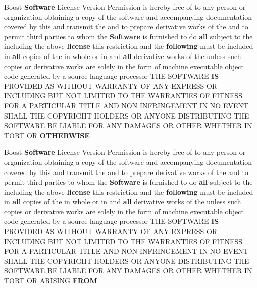 \begin{DoxyCompactItemize}
Boost {\bf Software} License Version Permission is hereby free of to any person or organization obtaining a copy of the software and accompanying documentation covered by this and transmit the and to prepare derivative works of the and to permit third parties to whom the {\bf Software} is furnished to do {\bf all} subject to the including the above {\bf license} this restriction and the {\bf following} must be included in {\bf all} copies of the in whole or in and {\bf all} derivative works of the unless such copies or derivative works are solely in the form of machine executable object code generated by a source language processor T\+HE S\+O\+F\+T\+W\+A\+RE {\bf IS} P\+R\+O\+V\+I\+D\+ED AS W\+I\+T\+H\+O\+UT W\+A\+R\+R\+A\+N\+TY OF A\+NY E\+X\+P\+R\+E\+SS OR I\+N\+C\+L\+U\+D\+I\+NG B\+UT N\+OT L\+I\+M\+I\+T\+ED TO T\+HE W\+A\+R\+R\+A\+N\+T\+I\+ES OF F\+I\+T\+N\+E\+SS F\+OR A P\+A\+R\+T\+I\+C\+U\+L\+AR T\+I\+T\+LE A\+ND N\+ON I\+N\+F\+R\+I\+N\+G\+E\+M\+E\+NT IN NO E\+V\+E\+NT S\+H\+A\+LL T\+HE C\+O\+P\+Y\+R\+I\+G\+HT H\+O\+L\+D\+E\+RS OR A\+N\+Y\+O\+NE D\+I\+S\+T\+R\+I\+B\+U\+T\+I\+NG T\+HE S\+O\+F\+T\+W\+A\+RE BE L\+I\+A\+B\+LE F\+OR A\+NY D\+A\+M\+A\+G\+ES OR O\+T\+H\+ER W\+H\+E\+T\+H\+ER IN T\+O\+RT OR {\bf O\+T\+H\+E\+R\+W\+I\+SE}
\item 
Boost {\bf Software} License Version Permission is hereby free of to any person or organization obtaining a copy of the software and accompanying documentation covered by this and transmit the and to prepare derivative works of the and to permit third parties to whom the {\bf Software} is furnished to do {\bf all} subject to the including the above {\bf license} this restriction and the {\bf following} must be included in {\bf all} copies of the in whole or in and {\bf all} derivative works of the unless such copies or derivative works are solely in the form of machine executable object code generated by a source language processor T\+HE S\+O\+F\+T\+W\+A\+RE {\bf IS} P\+R\+O\+V\+I\+D\+ED AS W\+I\+T\+H\+O\+UT W\+A\+R\+R\+A\+N\+TY OF A\+NY E\+X\+P\+R\+E\+SS OR I\+N\+C\+L\+U\+D\+I\+NG B\+UT N\+OT L\+I\+M\+I\+T\+ED TO T\+HE W\+A\+R\+R\+A\+N\+T\+I\+ES OF F\+I\+T\+N\+E\+SS F\+OR A P\+A\+R\+T\+I\+C\+U\+L\+AR T\+I\+T\+LE A\+ND N\+ON I\+N\+F\+R\+I\+N\+G\+E\+M\+E\+NT IN NO E\+V\+E\+NT S\+H\+A\+LL T\+HE C\+O\+P\+Y\+R\+I\+G\+HT H\+O\+L\+D\+E\+RS OR A\+N\+Y\+O\+NE D\+I\+S\+T\+R\+I\+B\+U\+T\+I\+NG T\+HE S\+O\+F\+T\+W\+A\+RE BE L\+I\+A\+B\+LE F\+OR A\+NY D\+A\+M\+A\+G\+ES OR O\+T\+H\+ER W\+H\+E\+T\+H\+ER IN T\+O\+RT OR A\+R\+I\+S\+I\+NG {\bf F\+R\+OM}
\end{DoxyCompactItemize}


